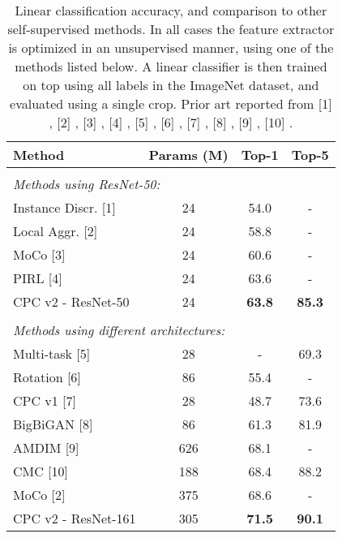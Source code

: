 \documentclass{article}
\begin{document}
\begin{table}[t]
\caption{Linear classification accuracy, and comparison to other self-supervised methods. In all cases the feature extractor is optimized in an unsupervised manner, using one of the methods listed below. A linear classifier is then trained on top using all labels in the ImageNet dataset, and evaluated using a single crop. Prior art reported from [1] \citet{wu2018unsupervised}, 
[2] \citet{zhuang2019local}, 
[3] \citet{he2019momentum},
[4] \citet{misra2019pirl},
[5] \citet{doersch2017multi}, 
[6] \citet{kolesnikov2019revisiting}, 
[7] \citet{oord2018representation}, 
[8] \citet{donahue2019large}, 
[9] \citet{bachman2019learning}, 
[10] \citet{tian2019contrastive}. }
\label{tab:linear_class}
\begin{center}
\begin{small}
\begin{sc}
\begin{tabular}{lccc}
\toprule
Method & Params (M) & Top-1 & Top-5 \\
\midrule \\ 
\multicolumn{4}{l}{\textit{Methods using ResNet-50:}} \\
Instance Discr. [1] & 24 & 54.0 & - \\
Local Aggr. [2]  & 24 & 58.8 & - \\
MoCo [3] & 24 & 60.6 & - \\ 
PIRL [4] & 24 & 63.6 & - \\
\midrule
CPC v2 - ResNet-50 & 24 & \textbf{63.8} & \textbf{85.3} \\ 
\midrule \\ 
\multicolumn{4}{l}{\textit{Methods using different architectures:}} \\
Multi-task [5]  & 28 & - & 69.3 \\
Rotation [6] & 86 & 55.4 & - \\ 
CPC v1  [7] & 28 & 48.7 & 73.6 \\ 
BigBiGAN [8] & 86 & 61.3 & 81.9 \\
AMDIM  [9] & 626 & 68.1 & - \\ 
CMC [10]  & 188 & 68.4 & 88.2 \\ 
MoCo [2]  & 375 & 68.6 & - \\ 
\midrule
CPC v2 - ResNet-161 & 305 & \textbf{71.5} & \textbf{90.1} \\ 
\bottomrule
\end{tabular}
\end{sc}
\end{small}
\end{center}
\vskip -0.1in
\end{table}
\end{document}
